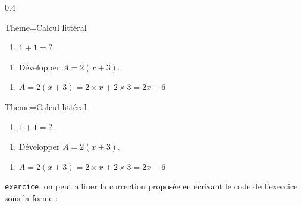 \documentclass[12pt,french]{article}
\newenvironment{Description}
               {\list{}{\labelwidth0pt \leftmargin0pt \itemindent-\leftmargin
                        \let\makelabel\Descriptionlabel}}
               {\endlist}
\newcommand*\Descriptionlabel[1]{\hspace\labelsep
                                \normalfont\bfseries #1}
\begin{document}
\begin{Codes}{0.4}{\footnotesize}
\begin{Maquette}[IE,CorrigeApres]{Theme=Calcul littéral}
  \begin{exercice}%
    \begin{enumerate}
    \item $1+1=?$.
    \end{enumerate}
  \end{exercice}
  \begin{exercice}
    \begin{enumerate}
    \item Développer $A=2(x+3)$.
    \end{enumerate}
  \end{exercice}
  \begin{Solution}
    \begin{enumerate}
    \item $A=2(x+3)=2\times x+2\times3=2x+6$
    \end{enumerate}
  \end{Solution}
\end{Maquette}
\end{Codes}
\begin{Maquette}[IE,CorrigeApres]{Theme=Calcul littéral}
    \begin{exercice}%
    \begin{enumerate}
    \item $1+1=?$.
    \end{enumerate}
  \end{exercice}
  \begin{exercice}
    \begin{enumerate}
    \item Développer $A=2(x+3)$.
    \end{enumerate}
  \end{exercice}
  \begin{Solution}
    \begin{enumerate}
    \item $A=2(x+3)=2\times x+2\times3=2x+6$
    \end{enumerate}
  \end{Solution}
\end{Maquette}
\begin{Description}
\item[Au niveau de l'environnement ]\lstinline!exercice!, on peut affiner la correction proposée en écrivant le code de l'exercice sous la forme :
\end{Description}
\end{document}
